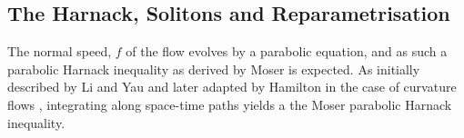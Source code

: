 


\subsection{The Harnack, Solitons and Reparametrisation}
\label{subsec:reparam}

The normal speed, $f$ of the flow evolves by a parabolic equation, and as such a parabolic Harnack inequality as derived by Moser \cite{Moser:02/1964} is expected. As initially described by Li and Yau \cite{LiYau:/1986} and later adapted by Hamilton in the case of curvature flows \cite{Hamilton:/1986,Hamilton:/1993,Hamilton:/1995}, integrating along space-time paths yields a the Moser parabolic Harnack inequality.

